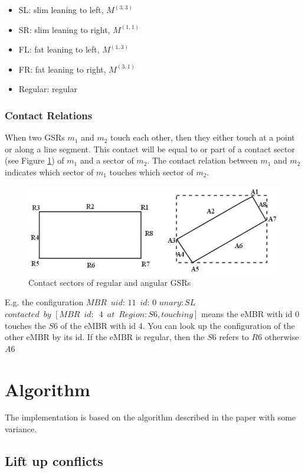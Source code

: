 \documentclass{article}
\begin{document}
\begin{itemize}
\item SL: slim leaning to left, $M^{(3,3)}$
\item SR: slim leaning to right, $M^{(1,1)}$
\item FL: fat leaning to left, $M^{(1,3)}$
\item FR: fat leaning to right,  $M^{(3,1)}$
\item Regular: regular
\end{itemize}
\subsubsection{Contact Relations}
When two GSRs $m_1$ and $m_2$ touch each other, then they either touch at a point or along a line segment. This contact will be equal to or part of a contact sector (see Figure \ref{sector}) of $m_1$ and a sector of $m_2$.
The contact relation between $m_1$ and $m_2$ indicates which sector of $m_1$ touches which sector of $m_2$.  
\begin{figure}[h!]
\centering\includegraphics[scale=0.35]{sectors.png}\caption{Contact sectors of regular and angular GSRs}
\label{sector}
\end{figure}
E.g. the configuration 
 ${MBR\,\,\, uid:\,11 \,\,\,id:\,0}$ $unary: SL$ $contacted\,\,\, by\,\, [ MBR\,\,\,id:\,\,\,4\,\,\,at\,\,\,Region: S6, touching ]$ means the eMBR with id 0 touches the $S6$ of the eMBR with id 4. You can look up the configuration of  the other eMBR by its id. If the eMBR is regular, then the $S6$ refers to $R6$ otherwise $A6$
\section{Algorithm}
The implementation is based on the algorithm described in the paper with some variance. 

\subsection{Lift up conflicts}\label{conflict}
\end{document}
